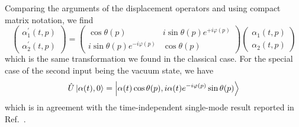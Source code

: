 Comparing the arguments of the displacement operators and using compact matrix notation, we find
\begin{equation}
	\begin{pmatrix}
		\alpha_1^\prime(t,p)
		\\
		\alpha_2^\prime(t,p)
	\end{pmatrix}
	=
	\begin{pmatrix}
		\cos\theta(p) & i\sin\theta(p)e^{+i\varphi(p)}
		\\
		i\sin\theta(p)e^{-i\varphi(p)} & \cos\theta(p)
	\end{pmatrix}
	\begin{pmatrix}
		\alpha_1(t,p)
		\\
		\alpha_2(t,p)
	\end{pmatrix}
\end{equation}
which is the same transformation we found in the classical case.
For the special case of the second input being the vacuum state, we have
\begin{equation}
	\hat{U}
	\ket{\alpha(t),0}
	=
	\ket{\alpha(t)\cos\theta(p),i\alpha(t)e^{-i\varphi(p)}\sin\theta(p)}
\end{equation}
which is in agreement with the time-independent single-mode result reported in Ref.~\cite[p.~134]{Haroche2006}.